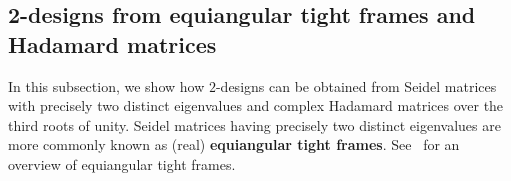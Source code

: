 \documentclass[11pt]{article}
\makeatletter
\newcommand*{\transpose}{%
  {\mathpalette\@transpose{}}%
}
\newcommand*{\@transpose}[2]{%
  \raisebox{\depth}{$\m@th#1\intercal$}%
}
\newtheorem{theorem}{Theorem}[section]
\makeatother
\begin{document}


\subsection{2-designs from equiangular tight frames and Hadamard matrices}
In this subsection, we show how $2$-designs can be obtained from Seidel matrices with precisely two distinct eigenvalues and complex Hadamard matrices over the third roots of unity.
Seidel matrices having precisely two distinct eigenvalues are more commonly known as (real) \textbf{equiangular tight frames}.
See~\cite{etf} for an overview of equiangular tight frames.


\end{document}
